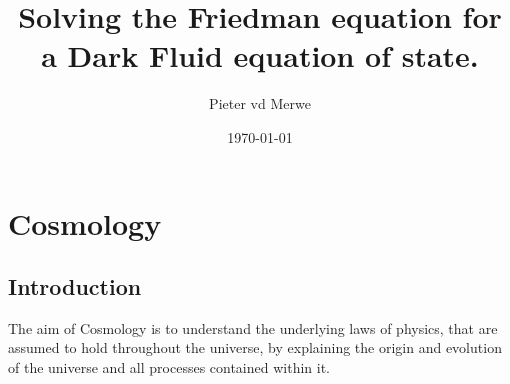 \documentclass[a4paper, 11pt]{FSKH_623_Report}
\title{Solving the Friedman equation for a Dark Fluid equation of state.}
\author{Pieter vd Merwe}
\date{\today}
\numberwithin{equation}{section}
\begin{document}
\maketitle

\tableofcontents                                                  
\pagebreak
{}
\chapter{Cosmology}
\section{Introduction}
The aim of Cosmology is to understand the underlying laws of physics, that are assumed to hold throughout the universe, by explaining the origin and evolution of the universe and all processes contained within it. 
\end{document}
